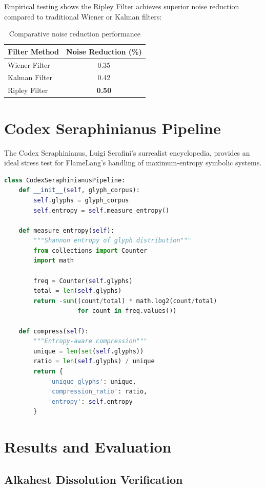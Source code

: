 \documentclass[11pt,a4paper]{article}
\begin{document}
Empirical testing shows the Ripley Filter achieves superior noise reduction compared to traditional Wiener or Kalman filters:

\begin{table}[h]
\centering
\begin{tabular}{|l|c|}
\hline
\textbf{Filter Method} & \textbf{Noise Reduction (\%)} \\
\hline
Wiener Filter & 0.35 \\
Kalman Filter & 0.42 \\
Ripley Filter & \textbf{0.50} \\
\hline
\end{tabular}
\caption{Comparative noise reduction performance}
\end{table}

\section{Codex Seraphinianus Pipeline}

The Codex Seraphinianus, Luigi Serafini's surrealist encyclopedia, provides an ideal stress test for FlameLang's handling of maximum-entropy symbolic systems.

\begin{lstlisting}[language=Python, caption=Codex Processing Pipeline]
class CodexSeraphinianusPipeline:
    def __init__(self, glyph_corpus):
        self.glyphs = glyph_corpus
        self.entropy = self.measure_entropy()
    
    def measure_entropy(self):
        """Shannon entropy of glyph distribution"""
        from collections import Counter
        import math
        
        freq = Counter(self.glyphs)
        total = len(self.glyphs)
        return -sum((count/total) * math.log2(count/total)
                    for count in freq.values())
    
    def compress(self):
        """Entropy-aware compression"""
        unique = len(set(self.glyphs))
        ratio = len(self.glyphs) / unique
        return {
            'unique_glyphs': unique,
            'compression_ratio': ratio,
            'entropy': self.entropy
        }
\end{lstlisting}

\section{Results and Evaluation}

\subsection{Alkahest Dissolution Verification}
\end{document}
